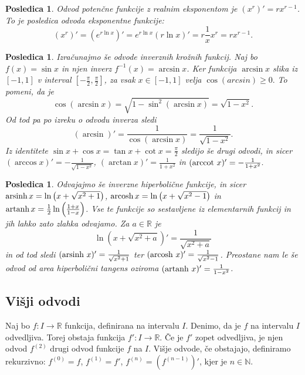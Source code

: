\documentclass[10pt, a4paper]{article}
\newtheorem{posledica}[izr]{Posledica}
\newcommand{\N}{\mathbb {N}}
\newcommand{\R}{\mathbb {R}}
\begin{document}
\begin{posledica}
    Odvod potenčne funkcije z realnim eksponentom je $(x^r)' = rx^{r-1}$. 
    To je posledica odvoda eksponentne funkcije:
    $$(x^r)' = (e^{r \ln x})' = e^{r \ln x} (r \ln x)' = r \frac{1}{x} x^r = rx^{r-1}.$$
\end{posledica}

\begin{posledica}
    Izračunajmo še odvode inverznih krožnih funkcij. 
    Naj bo $f(x) = \sin x$ in njen inverz $f^{-1} (x) = \arcsin x$.
    Ker funkcija $\arcsin x$ slika iz $[-1, 1]$ v interval $\left[-\frac{\pi}{2}, \frac{\pi}{2}\right]$, 
    za vsak $x \in [-1, 1]$ velja $\cos(arcsin) \geq 0.$
    To pomeni, da je $$\cos (\arcsin x) = \sqrt{1 - \sin^2 (\arcsin x)} = \sqrt{1 - x^2}.$$
    Od tod pa po izreku o odvodu inverza sledi 
    $$(\arcsin)' = \frac{1}{\cos (\arcsin x)} = \frac{1}{\sqrt{1 - x^2}}.$$
    Iz identitete $\sin x + \cos x = \tan x + \cot x = \frac{\pi}{2}$ sledijo še drugi odvodi, 
    in sicer $(\arccos x)' = -\frac{1}{\sqrt{1 - x^2}}$, $(\arctan x)' = \frac{1}{1 + x^2}$ in $(\textup{\text{arccot}}\ x)' = -\frac{1}{1 + x^2}.$ 
\end{posledica}

\begin{posledica}
    Odvajajmo še inverzne hiperbolične funkcije, in sicer 
    $\textup{\text{arsinh}}\,x = \ln \left(x + \sqrt{x^2 + 1}\right)$,
    $\textup{\text{arcosh}}\,x = \ln \left(x + \sqrt{x^2 - 1}\right)$ in
    $\textup{\text{artanh}}\,x = \frac{1}{2} \ln \left(\frac{1+x}{1-x}\right)$.
    Vse te funkcije so sestavljene iz elementarnih funkcij in jih lahko zato zlahka odvajamo.
    Za $a \in \R$ je $$\ln \left(x + \sqrt{x^2 + a}\right)' = \frac{1}{\sqrt{x^2 + a}}$$
    in od tod sledi $(\textup{\text{arsinh}}\ x)' = \frac{1}{\sqrt{x^2 + 1}}$ ter $(\textup{\text{arcosh}}\ x)' = \frac{1}{\sqrt{x^2 - 1}}$.
    Preostane nam le še odvod od area hiperbolični tangens oziroma $(\textup{\text{artanh}}\ x)' = \frac{1}{1 - x^2}$.
\end{posledica}

\subsection{Višji odvodi}

Naj bo $f: I \rightarrow \R$ funkcija, definirana na intervalu $I$. 
Denimo, da je $f$ na intervalu $I$ odvedljiva.
Torej obstaja funkcija $f': I \rightarrow \R.$
Če je $f'$ zopet odvedljiva, je njen odvod $f^{(2)}$ drugi odvod funkcije $f$ na $I$.
Višje odvode, če obstajajo, definiramo rekurzivno: $f^{(0)} = f$, $f^{(1)} = f'$, $f^{(n)} = (f^{(n-1)})'$, kjer je $n \in \N.$
\end{document}
